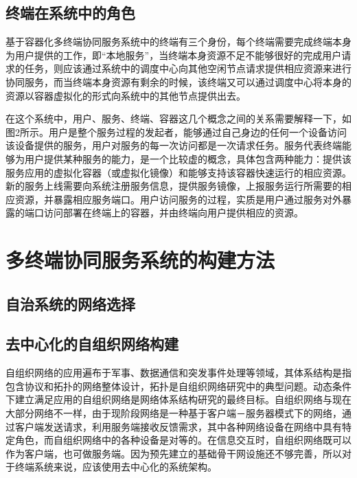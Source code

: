 \subsection{终端在系统中的角色}

基于容器化多终端协同服务系统中的终端有三个身份，每个终端需要完成终端本身为用户提供的工作，即“本地服务”，当终端本身资源不足不能够很好的完成用户请求的任务，则应该通过系统中的调度中心向其他空闲节点请求提供相应资源来进行协同服务，而当终端本身资源有剩余的时候，该终端又可以通过调度中心将本身的资源以容器虚拟化的形式向系统中的其他节点提供出去。

在这个系统中，用户、服务、终端、容器这几个概念之间的关系需要解释一下，如图2所示。用户是整个服务过程的发起者，能够通过自己身边的任何一个设备访问该设备提供的服务，用户对服务的每一次访问都是一次请求任务。服务代表终端能够为用户提供某种服务的能力，是一个比较虚的概念，具体包含两种能力：提供该服务应用的虚拟化容器（或虚拟化镜像）和能够支持该容器快速运行的相应资源。新的服务上线需要向系统注册服务信息，提供服务镜像，上报服务运行所需要的相应资源，并暴露相应服务端口。用户访问服务的过程，实质是用户通过服务对外暴露的端口访问部署在终端上的容器，并由终端向用户提供相应的资源。


\section{多终端协同服务系统的构建方法}\label{sec:service_system_decentralized_network}
\subsection{自治系统的网络选择}
\subsection{去中心化的自组织网络构建}

自组织网络的应用遍布于军事、数据通信和突发事件处理等领域，其体系结构是指包含协议和拓扑的网络整体设计，拓扑是自组织网络研究中的典型问题。动态条件下建立满足应用的自组织网络是网络体系结构研究的最终目标。自组织网络与现在大部分网络不一样，由于现阶段网络是一种基于客户端－服务器模式下的网络，通过客户端发送请求，利用服务端接收反馈需求，其中各种网络设备在网络中具有特定角色，而自组织网络中的各种设备是对等的。在信息交互时，自组织网络既可以作为客户端，也可做服务端。因为预先建立的基础骨干网设施还不够完善，所以对于终端系统来说，应该使用去中心化的系统架构。


